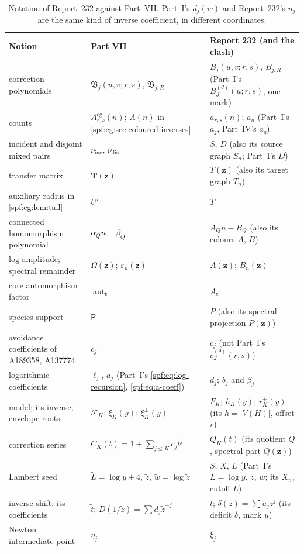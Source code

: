\documentclass[11pt]{article}
\numberwithin{equation}{section}
\theoremstyle{definition}
\theoremstyle{remark}
\theoremstyle{definition}
\begin{document}
\begin{table}[htbp]
\centering\small
\renewcommand{\arraystretch}{1.12}
\begin{tabular}{@{}>{\raggedright\arraybackslash}p{}>{\raggedright\arraybackslash}p{}>{\raggedright\arraybackslash}p{}@{}}
\toprule
Notion & Part VII & Report 232 (and the clash)\\
\midrule
correction polynomials & $\mathfrak B_j(u,v;r,s)$, $\mathfrak B_{j,R}$ & $B_j(u,v;r,s)$, $B_{j,R}$ (Part~I's $B_J^{(\theta)}(u;r,s)$, one mark)\\
counts & $A^{\mathrm{cg}}_{r,s}(n)$; $A(n)$ in \cref{spf:cg:sec:coloured-inverses} & $a_{r,s}(n)$; $a_n$ (Part~I's $a_j$, Part~IV's $a_q$)\\
incident and disjoint mixed pairs & $\nu_{\mathrm{inc}}$, $\nu_{\mathrm{dis}}$ & $S$, $D$ (also its source graph $S_n$; Part~I's $D$)\\
transfer matrix & $\mathbf T(\boldsymbol z)$ & $T(\boldsymbol z)$ (also its target graph $T_n$)\\
auxiliary radius in \cref{spf:cg:lem:tail} & $U'$ & $T$\\
connected homomorphism polynomial & $\alpha_Qn-\beta_Q$ & $A_Qn-B_Q$ (also its colours $A$, $B$)\\
log-amplitude; spectral remainder & $\Omega(\boldsymbol z)$; $\varepsilon_n(\boldsymbol z)$ & $A(\boldsymbol z)$; $B_n(\boldsymbol z)$\\
core automorphism factor & $\operatorname{aut}_{\boldsymbol t}$ & $A_{\boldsymbol t}$\\
species support & $\mathsf P$ & $P$ (also its spectral projection $P(\boldsymbol z)$)\\
avoidance coefficients of A189358, A137774 & $c_j$ & $c_j$ (not Part~I's $c_J^{(\theta)}(r,s)$)\\
logarithmic coefficients & $\ell_j$, $a_j$ (Part~I's \eqref{spf:eq:log-recursion}, \eqref{spf:eq:a-coeff}) & $d_j$; $b_j$ and $\beta_j$\\
model; its inverse; envelope roots & $\mathcal F_K$; $\xi_K(y)$; $\xi_K^\pm(y)$ & $F_K$; $h_K(y)$; $r_K^\pm(y)$ (its $h=|V(H)|$, offset $r$)\\
correction series & $C_K(t)=1+\sum_{j\le K}c_jt^j$ & $Q_K(t)$ (its quotient $Q$, spectral part $Q(\boldsymbol z)$)\\
Lambert seed & $\tilde L=\log y+4$, $\tilde z$, $\tilde w=\log\tilde z$ & $S$, $X$, $L$ (Part~I's $L=\log y$, $z$, $w$; its $X_n$, cutoff $L$)\\
inverse shift; its coefficients & $\tilde t$; $D(1/\tilde z)=\sum d_j\tilde z^{-j}$ & $t$; $\delta(z)=\sum u_jz^j$ (its deficit $\delta$, mark $u$)\\
Newton intermediate point & $\eta_j$ & $\xi_j$\\
\bottomrule
\end{tabular}
\caption{Notation of Report~232 against Part~VII. Part~I's $d_j(w)$ and
Report~232's $u_j$ are the same kind of inverse coefficient, in different
coordinates.}
\label{spf:cg:tab:dictionary}
\end{table}
\end{document}
